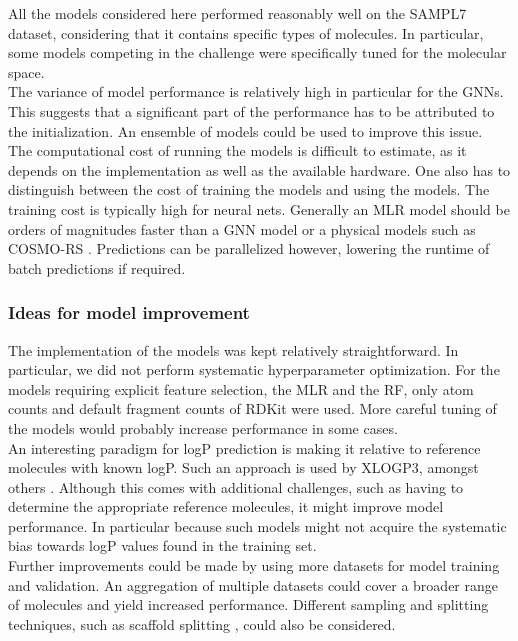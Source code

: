 \documentclass{article}
\begin{document}
All the models considered here performed reasonably well on the SAMPL7 dataset, considering that it contains specific types of molecules. In particular, some models competing in the challenge were specifically tuned for the molecular space. \\

The variance of model performance is relatively high in particular for the GNNs. This suggests that a significant part of the performance has to be attributed to the initialization. An ensemble of models could be used to improve this issue. \\

The computational cost of running the models is difficult to estimate, as it depends on the implementation as well as the available hardware. One also has to distinguish between the cost of training the models and using the models. The training cost is typically high for neural nets. Generally an MLR model should be orders of magnitudes faster than a GNN model or a physical models such as COSMO-RS \cite{klamt2011cosmo}. Predictions can be parallelized however, lowering the runtime of batch predictions if required. \\

\subsubsection{Ideas for model improvement}

The implementation of the models was kept relatively straightforward. In particular, we did not perform systematic hyperparameter optimization. For the models requiring explicit feature selection, the MLR and the RF, only atom counts and default fragment counts of RDKit were used. More careful tuning of the models would probably increase performance in some cases. \\

An interesting paradigm for logP prediction is making it relative to reference molecules with known logP. Such an approach is used by XLOGP3, amongst others \cite{cheng2007computation}. Although this comes with additional challenges, such as having to determine the appropriate reference molecules, it might improve model performance. In particular because such models might not acquire the systematic bias towards logP values found in the training set. \\

Further improvements could be made by using more datasets for model training and validation. An aggregation of multiple datasets could cover a broader range of molecules and yield increased performance. Different sampling and splitting techniques, such as scaffold splitting \cite{bemis1996properties}, could also be considered. \\
\end{document}
